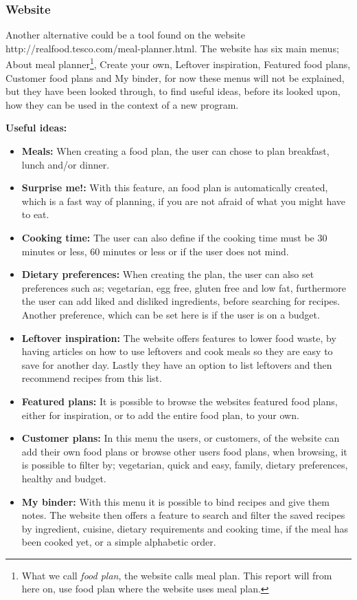\subsubsection{Website}
Another alternative could be a tool found on the website http://realfood.tesco.com/meal-planner.html\cite{tesco_foodplan}. The website has six main menus; About meal planner\footnote{What we call \textit{food plan}, the website calls meal plan. This report will from here on, use food plan where the website uses meal plan.}, Create your own, Leftover inspiration, Featured food plans, Customer food plans and My binder, for now these menus will not be explained, but they have been looked through, to find useful ideas, before its looked upon, how they can be used in the context of a new program.

\textbf{Useful ideas:}
\begin{itemize}
  \item \textbf{Meals:} When creating a food plan, the user can chose to plan breakfast, lunch and/or dinner.
  \item \textbf{Surprise me!:} With this feature, an food plan is automatically created, which is a fast way of planning, if you are not afraid of what you might have to eat.
  \item \textbf{Cooking time:} The user can also define if the cooking time must be 30 minutes or less, 60 minutes or less or if the user does not mind.
  \item \textbf{Dietary preferences:} When creating the plan, the user can also set preferences such as; vegetarian, egg free, gluten free and low fat, furthermore the user can add liked and disliked ingredients, before searching for recipes. Another preference, which can be set here is if the user is on a budget.
  \item \textbf{Leftover inspiration:} The website offers features to lower food waste, by having articles on how to use leftovers and cook meals so they are easy to save for another day. Lastly they have an option to list leftovers and then recommend recipes from this list.
  \item \textbf{Featured plans:} It is possible to browse the websites featured food plans, either for inspiration, or to add the entire food plan, to your own.
  \item \textbf{Customer plans:} In this menu the users, or customers, of the website can add their own food plans or browse other users food plans, when browsing, it is possible to filter by; vegetarian, quick and easy, family, dietary preferences, healthy and budget.
  \item \textbf{My binder:} With this menu it is possible to bind recipes and give them notes. The website then offers a feature to search and filter the saved recipes by ingredient, cuisine, dietary requirements and cooking time, if the meal has been cooked yet, or a simple alphabetic order.
\end{itemize}

